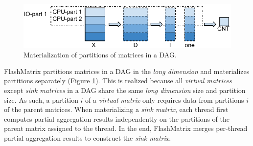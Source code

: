 \begin{figure}
	\centering
	\includegraphics[scale=0.6]{FlashMatrix_figs/materialize.pdf}
	\caption{Materialization of partitions of matrices in a DAG.}
	\label{fig:mater}
\end{figure}

FlashMatrix partitions matrices in a DAG in the \textit{long dimension} and
materializes partitions separately (Figure \ref{fig:mater}). This is realized
because all \textit{virtual matrices} except \textit{sink matrices} in a DAG
share the same \textit{long dimension} size and partition size. As such,
a partition $i$ of a \textit{virtual matrix} only requires data from partitions
$i$ of the parent matrices.
When materializing a \textit{sink matrix}, each thread first computes partial
aggregation results independently on the partitions of the parent matrix
assigned to the thread. In the end, FlashMatrix merges per-thread partial
aggregation results to construct the \textit{sink matrix}.


